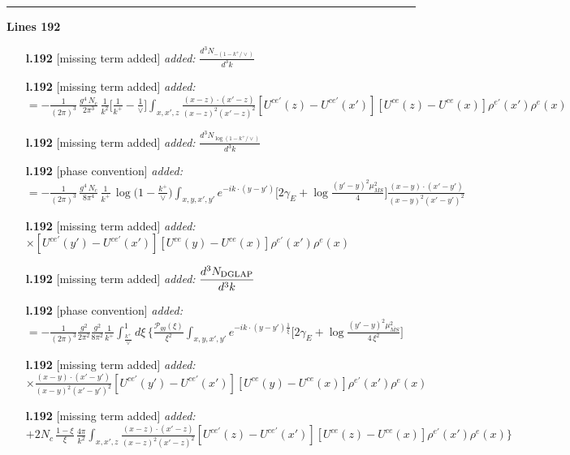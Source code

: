 \documentclass[10pt]{article}
\begin{document}
\noindent\rule{\linewidth}{0.3pt}\par\noindent\textbf{Lines 192} \par
\begin{itemize}[leftmargin=2.2em,itemsep=1pt,topsep=2pt]
\item[\textbf{l.192}] \textsf{\small [missing term added]} \emph{added:} $\displaystyle \frac{d^{3}N_{-(1-k^{+}/\vee)}}{d^{3}k}$
\item[\textbf{l.192}] \textsf{\small [missing term added]} \emph{added:} $\displaystyle = -\frac{1}{(2\pi)^{3}}\,\frac{g^{4}\,N_{c}}{2\pi^{3}}\,\frac{1}{k^{2}}\Big[\frac{1}{k^{+}}-\frac{1}{\vee}\Big]\int_{x,x',z}\frac{(x-z)\cdot(x'-z)}{(x-z)^{2}(x'-z)^{2}}[U^{ce'}(z) - U^{ce'}(x')][U^{ce}(z) - U^{ce}(x)]\rho^{e'}(x')\rho^{e}(x)$
\item[\textbf{l.192}] \textsf{\small [missing term added]} \emph{added:} $\displaystyle \frac{d^{3}N_{\log(1-k^{+}/\vee)}}{d^{3}k}$
\item[\textbf{l.192}] \textsf{\small [phase convention]} \emph{added:} $\displaystyle = -\frac{1}{(2\pi)^{3}}\,\frac{g^{4}\,N_{c}}{8\pi^{4}}\,\frac{1}{k^{+}}\,\log\Big(1-\frac{k^{+}}{\vee}\Big)\int_{x,y,x',y'}e^{-ik\cdot(y-y')}\Big[2\gamma_{E}+\log\frac{(y'-y)^{2}\mu^{2}_{\overline{MS}}}{4}\Big]\frac{(x-y)\cdot(x'-y')}{(x-y)^{2}(x'-y')^{2}}$
\item[\textbf{l.192}] \textsf{\small [missing term added]} \emph{added:} $\displaystyle \times[U^{ce'}(y') - U^{ce'}(x')][U^{ce}(y) - U^{ce}(x)]\rho^{e'}(x')\rho^{e}(x)$
\item[\textbf{l.192}] \textsf{\small [missing term added]} \emph{added:} $\displaystyle \frac{d^{3}N_{\rm DGLAP}}{d^{3}k}$
\item[\textbf{l.192}] \textsf{\small [phase convention]} \emph{added:} $\displaystyle = -\frac{1}{(2\pi)^{3}}\frac{g^{2}}{2\pi^{2}}\frac{g^{2}}{8\pi^{2}}\frac{1}{k^{+}}\int_{\frac{k^{+}}{\vee}}^{1}d\xi\,\Bigg\{\frac{\mathcal P_{gg}(\xi)}{\xi^{2}}\int_{x,y,x',y'}e^{-ik\cdot(y-y')\frac{1}{\xi}}\Big[2\gamma_{E}+\log\frac{(y'-y)^{2}\mu^{2}_{\overline{MS}}}{4\,\xi^{2}}\Big]$
\item[\textbf{l.192}] \textsf{\small [missing term added]} \emph{added:} $\displaystyle \times\frac{(x-y)\cdot(x'-y')}{(x-y)^{2}(x'-y')^{2}}[U^{ce'}(y') - U^{ce'}(x')][U^{ce}(y) - U^{ce}(x)]\rho^{e'}(x')\rho^{e}(x)$
\item[\textbf{l.192}] \textsf{\small [missing term added]} \emph{added:} $\displaystyle +2N_{c}\,\frac{1-\xi}{\xi}\,\frac{4\pi}{k^{2}}\int_{x,x',z}\frac{(x-z)\cdot(x'-z)}{(x-z)^{2}(x'-z)^{2}}[U^{ce'}(z) - U^{ce'}(x')][U^{ce}(z) - U^{ce}(x)]\rho^{e'}(x')\rho^{e}(x)\Bigg\}$

\end{itemize}
\end{document}
